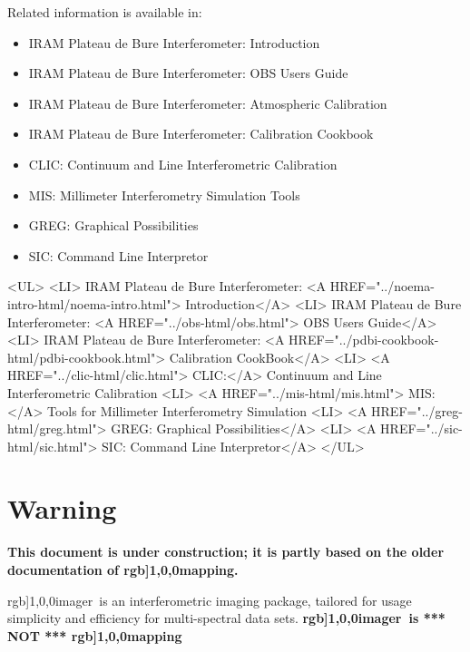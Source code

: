 \documentclass[11pt]{article}
\renewcommand{\mapping}{\mbox{{\color[rgb]{1,0,0}{\sc mapping}}}}
\newcommand{\imager} {\mbox{{\color[rgb]{1,0,0}{\sc imager}}}}
\newcommand{\imager} {\mbox{{{\sc imager}}}}
\renewcommand{\color}[1]{} %
\begin{document}
Related information is available in:
\begin{latexonly}
  \begin{itemize}
  \item{IRAM Plateau de Bure Interferometer: Introduction}
  \item{IRAM Plateau de Bure Interferometer: OBS Users Guide}
  \item{IRAM Plateau de Bure Interferometer: Atmospheric Calibration}
  \item{IRAM Plateau de Bure Interferometer: Calibration Cookbook}
  \item{CLIC: Continuum and Line Interferometric Calibration}
  \item{MIS:  Millimeter Interferometry Simulation Tools}
  \item{GREG: Graphical Possibilities}
  \item{SIC:  Command Line Interpretor}
  \end{itemize}
\end{latexonly}
%
\begin{rawhtml}
  <UL>
  <LI> IRAM Plateau de Bure Interferometer: <A HREF="../noema-intro-html/noema-intro.html">
  Introduction</A>
  <LI> IRAM Plateau de Bure Interferometer: <A HREF="../obs-html/obs.html"> 
  OBS Users Guide</A>
  <LI> IRAM Plateau de Bure Interferometer: <A HREF="../pdbi-cookbook-html/pdbi-cookbook.html"> 
  Calibration CookBook</A>
  <LI> <A HREF="../clic-html/clic.html"> CLIC:</A>  
  Continuum and Line Interferometric Calibration 
  <LI> <A HREF="../mis-html/mis.html"> MIS:</A>
  Tools for Millimeter Interferometry Simulation
  <LI> <A HREF="../greg-html/greg.html"> GREG: Graphical Possibilities</A>
  <LI> <A HREF="../sic-html/sic.html">   SIC:  Command Line Interpretor</A>
  </UL>
\end{rawhtml}

\newpage
\tableofcontents{} %


\newpage
\section{Warning}

\textbf{This document is under construction; it is partly based on the older documentation of \mapping{}.}

\imager\ is an interferometric imaging package, tailored for usage
  simplicity and efficiency for multi-spectral data sets.
\textbf{\imager\  is *** NOT *** \mapping }
 
\end{document}
